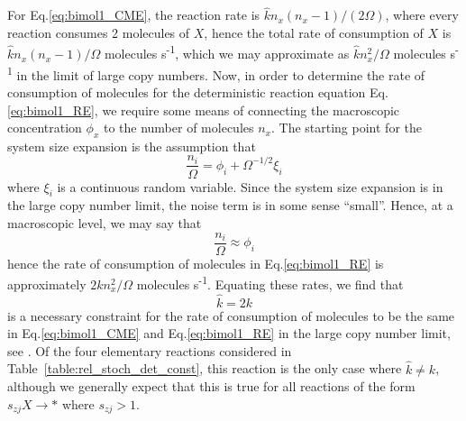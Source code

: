 \documentclass[10pt,letterpaper]{article}
\begin{document}
For Eq.\eqref{eq:bimol1_CME}, the reaction rate is $\hat{k}n_x(n_x-1)/(2\Omega)$, where every reaction consumes 2 molecules of $X$, hence the total rate of consumption of $X$ is $\hat{k}n_x(n_x-1)/\Omega$ molecules s\textsuperscript{-1}, which we may approximate as $\hat{k}n_x^2/\Omega$ molecules s\textsuperscript{-1} in the limit of large copy numbers. Now, in order to determine the rate of consumption of molecules for the deterministic reaction equation Eq.\eqref{eq:bimol1_RE}, we require some means of connecting the macroscopic concentration $\phi_x$ to the number of molecules $n_x$. The starting point for the system size expansion is the assumption that
\begin{equation}
\frac{n_i}{\Omega} = \phi_i + \Omega^{-1/2}\xi_i \label{eq:sse_asumpt}
\end{equation}
where $\xi_i$ is a continuous random variable. Since the system size expansion is in the large copy number limit\cite{Van92, Grima11}, the noise term is in some sense ``small''. Hence, at a macroscopic level, we may say that
\begin{equation}
\frac{n_i}{\Omega} \approx \phi_i
\end{equation}
hence the rate of consumption of molecules in Eq.\eqref{eq:bimol1_RE} is approximately $2kn_x^2/\Omega$ molecules s\textsuperscript{-1}. Equating these rates, we find that
\begin{equation}
\hat{k} = 2k \label{eq:rc_neq_bimol1}
\end{equation}
is a necessary constraint for the rate of consumption of molecules to be the same in Eq.\eqref{eq:bimol1_CME} and Eq.\eqref{eq:bimol1_RE} in the large copy number limit, see \cite{Wilkinson11, Gillespie07,Gillespie76}. Of the four elementary reactions considered in Table~\ref{table:rel_stoch_det_const}, this reaction is the only case where $\hat{k} \neq k$, although we  generally expect that this is true for all reactions of the form $s_{zj}X \rightarrow *$ where $s_{zj} > 1$.
\end{document}
